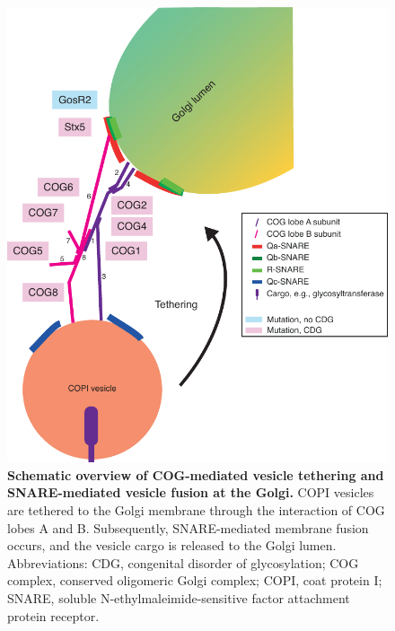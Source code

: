\begin{figure}
    \includegraphics[keepaspectratio=true,width=\textwidth,height=\textheight]{chapters/chapter2/chapter2_Figure4}
    \caption{\textbf{Schematic overview of COG-mediated vesicle tethering and SNARE-mediated vesicle fusion at the Golgi.} COPI vesicles are tethered to the Golgi membrane through the interaction of COG lobes A and B. Subsequently, SNARE-mediated membrane fusion occurs, and the vesicle cargo is released to the Golgi lumen. Abbreviations: CDG, congenital disorder of glycosylation; COG complex, conserved oligomeric Golgi complex; COPI, coat protein I; SNARE, soluble N-ethylmaleimide-sensitive factor attachment protein receptor.}
    \label{fig:ch2fig4}
\end{figure}

